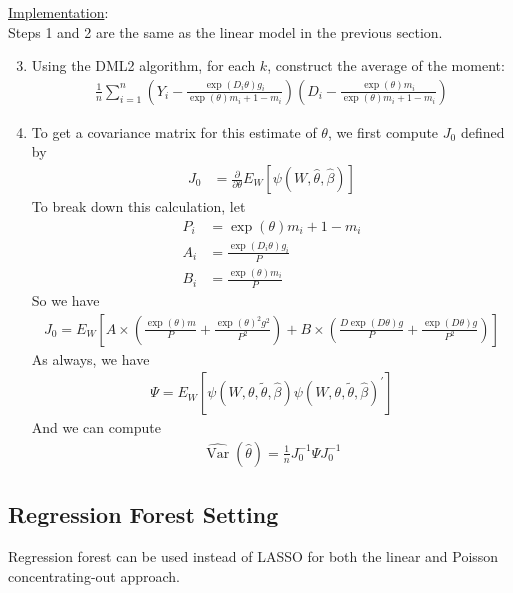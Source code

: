 \documentclass[11pt]{article}
\begin{document}
\noindent \underline{Implementation}: \\
Steps 1 and 2 are the same as the linear model in the previous section.
\begin{enumerate}
  \setcounter{enumi}{2}
	\item Using the DML2 algorithm, for each $k$, construct the average of the moment:
  \begin{gather*}
  	\frac{1}{n}\sum_{i = 1}^n \left(Y_i-\frac{\exp (D_i \theta) g_i}{\exp (\theta) m_i+1-m_i}\right)\left(D_i-\frac{\exp (\theta) m_i}{\exp (\theta) m_i+1-m_i}\right)
  \end{gather*}
	\item To get a covariance matrix for this estimate of $\theta$, we first compute $J_0$ defined by
	\begin{align*}
		J_{0} &=\frac{\partial}{\partial \theta} E_{W}\left[ \psi(W, \hat{\theta}, \hat{\beta}) \right]
	\end{align*}
	To break down this calculation, let
	\begin{align*}
		P_i &= \exp (\theta) m_i+1-m_i \\
		A_i &= \frac{\exp (D_i \theta) g_i}{P} \\
		B_i &= \frac{\exp (\theta) m_i}{P}
	\end{align*}
	So we have
  \begin{align*}
  	J_0 = E_W\left[ A \times \left(\frac{\exp(\theta)m }{P} + \frac{\exp(\theta)^2g^2}{P^2}\right) + B \times \left(\frac{D\exp(D\theta)g}{P} + \frac{\exp(D\theta)g}{P^2}\right) \right]
  \end{align*}
	As always, we have
	\begin{gather*}
		\Psi=E_{W}\left[\psi(W, \theta, \tilde{\theta}, \hat{\beta}) \psi(W, \theta, \tilde{\theta}, \hat{\beta})^{\prime}\right]
	\end{gather*}
	And we can compute
	\begin{gather*}
		\hat{\operatorname{Var}}(\hat{\theta})=\frac{1}{n} J_{0}^{-1} \Psi J_{0}^{-1}
	\end{gather*}
\end{enumerate}

\subsection{Regression Forest Setting}
Regression forest can be used instead of LASSO for both the linear and Poisson concentrating-out approach.
\end{document}

